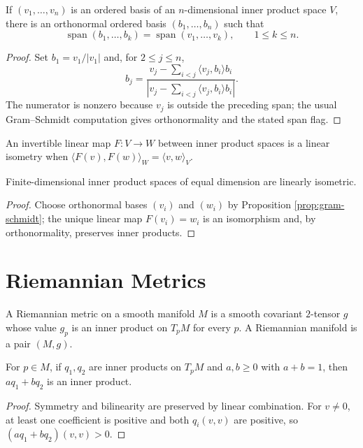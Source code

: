 \begin{proposition}
\label{prop:gram-schmidt}
\leanok
{}
If $(v_1,\ldots,v_n)$ is an ordered basis of an $n$-dimensional inner product space $V$, there is an orthonormal ordered basis $(b_1,\ldots,b_n)$ such that
\[
\operatorname{span}(b_1,\ldots,b_k)=\operatorname{span}(v_1,\ldots,v_k),\qquad 1\le k\le n.
\]
\end{proposition}
\begin{proof}
\leanok
\sketch Set $b_1=v_1/|v_1|$ and, for $2\le j\le n$,
\[
b_j=\frac{v_j-\sum_{i<j}\langle v_j,b_i\rangle b_i}{\left|v_j-\sum_{i<j}\langle v_j,b_i\rangle b_i\right|}.
\]
The numerator is nonzero because $v_j$ is outside the preceding span; the usual Gram--Schmidt computation gives orthonormality and the stated span flag.
\end{proof}

An invertible linear map $F:V\to W$ between inner product spaces is a linear isometry when $\langle F(v),F(w)\rangle_W=\langle v,w\rangle_V$.

\begin{proposition}
\label{prop:inner-product-spaces-linearly-isometric}
\leanok
{}
Finite-dimensional inner product spaces of equal dimension are linearly isometric.
\end{proposition}
\begin{proof}
\leanok
\sketch Choose orthonormal bases $(v_i)$ and $(w_i)$ by Proposition \ref{prop:gram-schmidt}; the unique linear map $F(v_i)=w_i$ is an isomorphism and, by orthonormality, preserves inner products.
\end{proof}

\section{Riemannian Metrics}

\begin{definition}
\label{def:riemannian-metric}
\leanok
A Riemannian metric on a smooth manifold $M$ is a smooth covariant $2$-tensor $g$ whose value $g_p$ is an inner product on $T_pM$ for every $p$. A Riemannian manifold is a pair $(M,g)$.
\end{definition}

\begin{lemma}
\label{lem:convex-inner-products}
\leanok
For $p\in M$, if $q_1,q_2$ are inner products on $T_pM$ and $a,b\ge0$ with $a+b=1$, then $a q_1+b q_2$ is an inner product.
\end{lemma}
\begin{proof}
\leanok
\sketch Symmetry and bilinearity are preserved by linear combination. For $v\ne0$, at least one coefficient is positive and both $q_i(v,v)$ are positive, so $(a q_1+b q_2)(v,v)>0$.
\end{proof}

